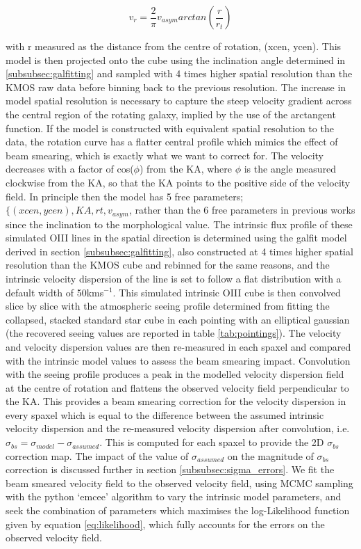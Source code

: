 \documentclass[a4paper,fleqn,usenatbib]{mn2e}
\begin{document}
\begin{equation}\label{eq:arctangent}
   v_{r} = \frac{2}{\pi}v_{asym}arctan\left(\frac{r}{r_{t}}\right)
\end{equation}

\noindent
with r measured as the distance from the centre of rotation, (xcen, ycen).
This model is then projected onto the cube using the inclination angle determined in \cref{subsubsec:galfitting} and sampled with 4 times higher spatial resolution than the KMOS raw data before binning back to the previous resolution.
The increase in model spatial resolution is necessary to capture the steep velocity gradient across the central region of the rotating galaxy, implied by the use of the arctangent function.
If the model is constructed with equivalent spatial resolution to the data, the rotation curve has a flatter central profile which mimics the effect of beam smearing, which is exactly what we want to correct for. 
The velocity decreases with a factor of cos($\phi$) from the KA, where $\phi$ is the angle measured clockwise from the KA, so that the KA points to the positive side of the velocity field.
In principle then the model has 5 free parameters; $\{(xcen, ycen), KA, rt, v_{asym}$, rather than the 6 free parameters in previous works \citep[e.g.]{Stott2016} since the inclination to the morphological value.
The intrinsic flux profile of these simulated OIII lines in the spatial direction is determined using the galfit model derived in section \cref{subsubsec:galfitting}, also constructed at 4 times higher spatial resolution than the KMOS cube and rebinned for the same reasons, and the intrinsic velocity dispersion of the line is set to follow a flat distribution with a default width of 50kms$^{-1}$.
This simulated intrinsic OIII cube is then convolved slice by slice with the atmospheric seeing profile determined from fitting the collapsed, stacked standard star cube in each pointing with an elliptical gaussian (the recovered seeing values are reported in table \ref{tab:pointings}).
The velocity and velocity dispersion values are then re-measured in each spaxel and compared with the intrinsic model values to assess the beam smearing impact.
Convolution with the seeing profile produces a peak in the modelled velocity dispersion field at the centre of rotation and flattens the observed velocity field perpendicular to the KA.
This provides a beam smearing correction for the velocity dispersion in every spaxel which is equal to the difference between the assumed intrinsic velocity dispersion and the re-measured velocity dispersion after convolution, i.e. $\sigma_{bs} = \sigma_{model} - \sigma_{assumed}$.
This is computed for each spaxel to provide the 2D $\sigma_{bs}$ correction map.
The impact of the value of $\sigma_{assumed}$ on the magnitude of $\sigma_{bs}$ correction is discussed further in section \cref{subsubsec:sigma_errors}.
We fit the beam smeared velocity field to the observed velocity field, using MCMC sampling with the python `emcee' algorithm \citep{Foreman-Mackey2013} to vary the intrinsic model parameters, and seek the combination of parameters which maximises the log-Likelihood function given by equation \ref{eq:likelihood}, which fully accounts for the errors on the observed velocity field.
\end{document}
